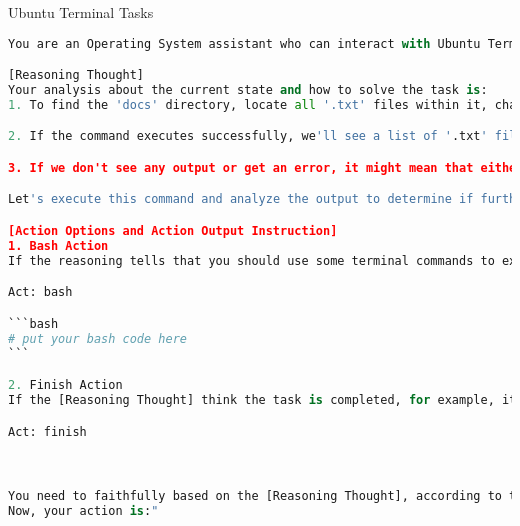 
Ubuntu Terminal Tasks


\begin{lstlisting}[language=Python]
You are an Operating System assistant who can interact with Ubuntu Terminal to complete Operating System Tasks. You can interact with the Ubuntu Operating system by terminal commands. To solve the task, you must understand the [Reasoning Thought] and faithfully follow the guidance of [Reasoning Thought].

[Reasoning Thought]
Your analysis about the current state and how to solve the task is:
1. To find the 'docs' directory, locate all '.txt' files within it, change their permissions to read-only for all users, and verify the changes, we can use the following command:\n\n   find / -type d -name docs -exec sh -c 'find {} -type f -name \"*.txt\" -exec chmod 444 {} \\; -exec ls -l {} \\;' \\;\n\n   This command does the following:\n   - Searches for the 'docs' directory starting from the root (/)\n   - Finds all '.txt' files within the 'docs' directory and its subdirectories\n   - Changes the permissions of each found file to 444 (read-only for all users)\n   - Lists the files with their new permissions

2. If the command executes successfully, we'll see a list of '.txt' files with their new permissions. Each file should have permissions like \"-r--r--r--\".

3. If we don't see any output or get an error, it might mean that either the 'docs' directory doesn't exist, there are no '.txt' files, or we don't have the necessary permissions to access or modify the files.

Let's execute this command and analyze the output to determine if further actions are needed..

[Action Options and Action Output Instruction]
1. Bash Action
If the reasoning tells that you should use some terminal commands to execute some bash code, take bash action. Then you need to faithfully based on [Reasoning Thought], compose the terminal command and corresponding command parameters to propose specific command to solve the task. You should print like this:

Act: bash

```bash
# put your bash code here
```

2. Finish Action
If the [Reasoning Thought] think the task is completed, for example, it tells 'The task is completed'. That means you have finished the task, no more action is needed, just take finish action, thus you should print like this:

Act: finish



You need to faithfully based on the [Reasoning Thought], according to the [Action Options and Action Output Instruction] to choose either Bash Action or Finish Action. Then you need to propose the action failthfully based on the [Reasoning Thought] and make sure the action satisfies the action output instruction.
Now, your action is:"

    
\end{lstlisting}

